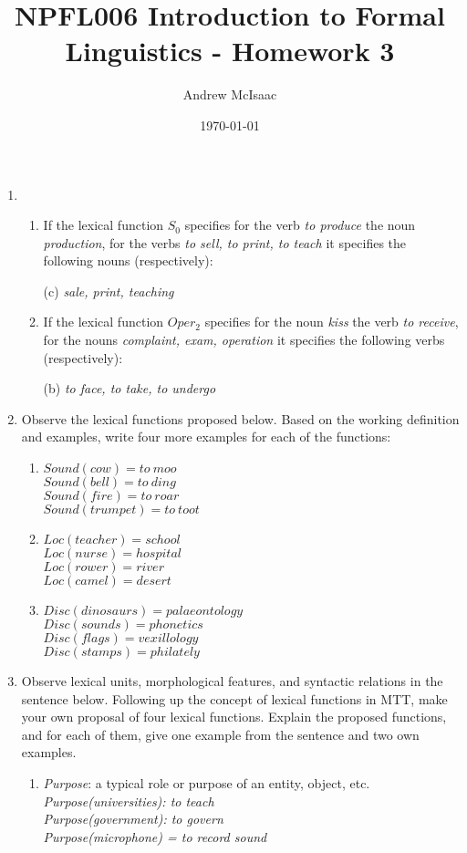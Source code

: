\documentclass[a4paper]{article}
\title{NPFL006 Introduction to Formal Linguistics - Homework 3}
\date{\today}
\author{Andrew McIsaac}
\begin{document}
\maketitle

\begin{enumerate}
	\item 
		\begin{enumerate}[label=\arabic*.]
			\item If the lexical function $S_0$ specifies for the verb
				\textit{to produce} the noun \textit{production}, for the verbs
				\textit{to sell, to print, to teach} it specifies the
				following nouns (respectively):

				(c) \textit{sale, print, teaching}

			\item If the lexical function $Oper_2$ specifies for the noun 
				\textit{kiss} the verb \textit{to receive}, for the nouns
				\textit{complaint, exam, operation} it specifies the following
				verbs (respectively):
				
				(b) \textit{to face, to take, to undergo}
		\end{enumerate}

	\item Observe the lexical functions proposed below. Based on the working
		definition and examples, write four more examples for each of the
		functions:
		\begin{enumerate}[label=\arabic*.]
			\item $Sound(cow) = to~moo$ \\
				$Sound(bell) = to~ding$ \\
				$Sound(fire) = to~roar$ \\
				$Sound(trumpet) = to~toot$
			\item $Loc(teacher) = school$ \\
				$Loc(nurse) = hospital$ \\
				$Loc(rower) = river$ \\
				$Loc(camel) = desert$
			\item $Disc(dinosaurs) = palaeontology$ \\
				$Disc(sounds) = phonetics$ \\
				$Disc(flags) = vexillology$ \\
				$Disc(stamps) = philately$
		\end{enumerate}

	\item Observe lexical units, morphological features, and syntactic relations
		in the sentence below. Following up the concept of lexical functions in
		MTT, make your own proposal of four lexical functions. Explain the
		proposed functions, and for each of them, give one example from the
		sentence and two own examples.
		\begin{enumerate}[label=\arabic*.]
			\item \textit{Purpose}: a typical role or purpose of an entity,
				object, etc. \\
				\textit{Purpose(universities): to teach} \\
				\textit{Purpose(government): to govern} \\
				\textit{Purpose(microphone) = to record sound}


\end{enumerate}
\end{enumerate}
\end{document}
